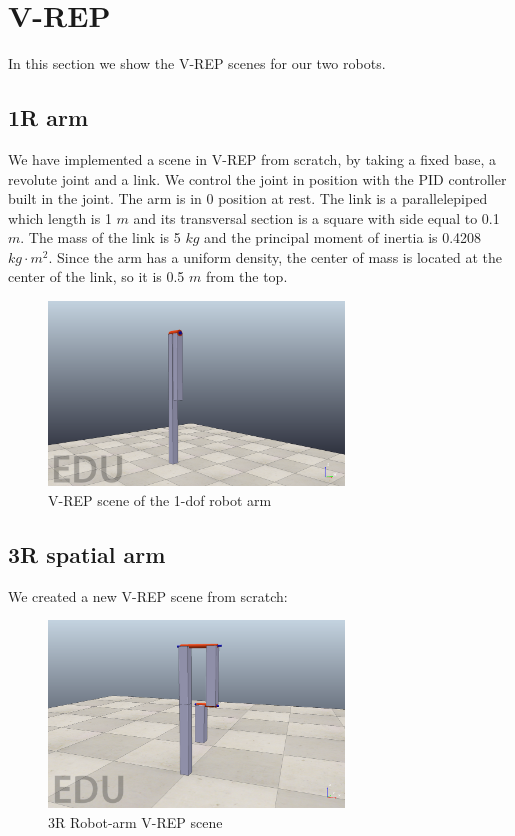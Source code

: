 \documentclass{article}
\begin{document}
\pagebreak

\section{V-REP}
In this section we show the V-REP scenes for our two robots.

\subsection{1R arm}We have implemented a scene in V-REP from scratch, by taking a fixed base, a revolute joint and a link. We control the joint in position with the PID controller built in the joint. The arm is in 0 position at rest. The link is a parallelepiped which length is 1 $m$ and its transversal section is a square with side equal to 0.1 $m$. The mass of the link is 5 $kg$ and the principal moment of inertia is 0.4208 $kg\cdot m^2$. Since the arm has a uniform density, the center of mass is located at the center of the link, so it is 0.5 $m$ from the top.

\begin{figure}[!htbp]
\centering
\includegraphics[width=0.7\textwidth]{images/1-dof/scene.png}
\caption{V-REP scene of the 1-dof robot arm}
\end{figure}
\FloatBarrier

\subsection{3R spatial arm} We created a new V-REP scene from scratch:
\FloatBarrier
\begin{figure}[!htbp]
\centering
\includegraphics[width=0.7\textwidth]{images/3-dof/scene.png}
\caption{3R Robot-arm V-REP scene}
\end{figure}
\FloatBarrier
\end{document}
